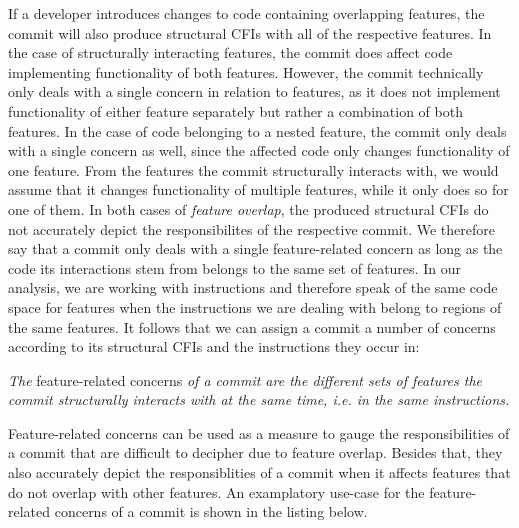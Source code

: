 If a developer introduces changes to code containing overlapping features, the commit will also produce structural CFIs with all of the respective features.
In the case of structurally interacting features, the commit does affect code implementing functionality of both features.
However, the commit technically only deals with a single concern in relation to features, as it does not implement functionality of either feature separately but rather a combination of both features.
In the case of code belonging to a nested feature, the commit only deals with a single concern as well, since the affected code only changes functionality of one feature.
From the features the commit structurally interacts with, we would assume that it changes functionality of multiple features, while it only does so for one of them.
In both cases of \emph{feature overlap}, the produced structural CFIs do not accurately depict the responsibilites of the respective commit.
We therefore say that a commit only deals with a single feature-related concern as long as the code its interactions stem from belongs to the same set of features.
In our analysis, we are working with instructions and therefore speak of the same code space for features when the instructions we are dealing with belong to regions of the same features.
It follows that we can assign a commit a number of concerns according to its structural CFIs and the instructions they occur in:
\begin{definition} \label{def:commit_concerns}
\emph{The} feature-related concerns \emph{of a commit are the different sets of features the commit structurally interacts with at the same time, i.e. in the same instructions.}
\end{definition}
Feature-related concerns can be used as a measure to gauge the responsibilities of a commit that are difficult to decipher due to feature overlap. 
Besides that, they also accurately depict the responsiblities of a commit when it affects features that do not overlap with other features.
An examplatory use-case for the feature-related concerns of a commit is shown in the listing below. \\
                             
